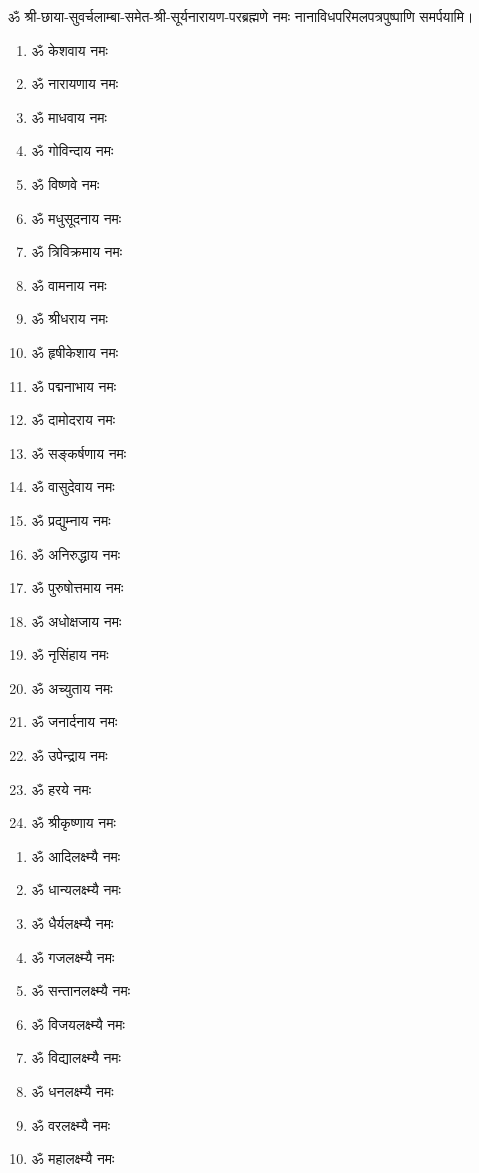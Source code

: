 \begin{center}
\begin{multicols}{2}
\begin{enumerate}
\end{enumerate}
\end{multicols}
ॐ श्री-छाया-सुवर्चलाम्बा-समेत-श्री-सूर्यनारायण-परब्रह्मणे नमः नानाविधपरिमलपत्रपुष्पाणि समर्पयामि। \medskip


\begin{multicols}{2}
\begin{enumerate}
\item ॐ केशवाय नमः
\item ॐ नारायणाय नमः
\item ॐ माधवाय नमः
\item ॐ गोविन्दाय नमः
\item ॐ विष्णवे नमः	
\item ॐ मधुसूदनाय नमः
\item ॐ त्रिविक्रमाय नमः
\item ॐ वामनाय नमः
\item ॐ श्रीधराय नमः
\item ॐ हृषीकेशाय नमः
\item ॐ पद्मनाभाय नमः
\item ॐ दामोदराय नमः
\item ॐ सङ्कर्षणाय नमः
\item ॐ वासुदेवाय नमः
\item ॐ प्रद्युम्नाय नमः
\item ॐ अनिरुद्धाय नमः
\item ॐ पुरुषोत्तमाय नमः
\item ॐ अधोक्षजाय नमः
\item ॐ नृसिंहाय नमः
\item ॐ अच्युताय नमः
\item ॐ जनार्दनाय नमः
\item ॐ उपेन्द्राय नमः 
\item ॐ हरये नमः
\item ॐ श्रीकृष्णाय नमः
\end{enumerate}
\end{multicols}


\begin{multicols}{2}
\begin{enumerate}
\item ॐ आदिलक्ष्म्यै नमः
\item ॐ धान्यलक्ष्म्यै नमः
\item ॐ धैर्यलक्ष्म्यै नमः
\item ॐ गजलक्ष्म्यै नमः
\item ॐ सन्तानलक्ष्म्यै नमः
\item ॐ विजयलक्ष्म्यै नमः
\item ॐ विद्यालक्ष्म्यै नमः
\item ॐ धनलक्ष्म्यै नमः
\item ॐ वरलक्ष्म्यै नमः
\item ॐ महालक्ष्म्यै नमः 
\end{enumerate}
\end{multicols}


\end{center}
